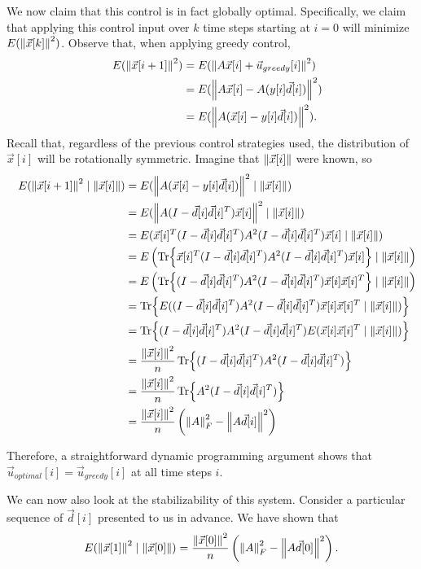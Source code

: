 \documentclass[letterpaper]{article}
\theoremstyle{remark}
\newcommand{\eqn}[1]{\begin{alignat*}{2}#1\end{alignat*}}
\begin{document}
We now claim that this control is in fact globally optimal. Specifically, we claim that applying this control input over $k$ time steps starting at $i=0$ will minimize $E(\norm{\vec{x}[k]}^2)$. Observe that, when applying greedy control,
\eqn{
    && E(\norm{\vec{x}[i+1]}^2) &= E(\norm{A\vec{x}[i] + \vec{u}_{greedy}[i]}^2) \\
    &&&= E(\norm{A\vec{x}[i] - A(y[i]\vec{d}[i])}^2) \\
    &&&= E(\norm{A(\vec{x}[i] - y[i]\vec{d}[i])}^2).
}
Recall that, regardless of the previous control strategies used, the distribution of $\vec{x}[i]$ will be rotationally symmetric. Imagine that $\norm{\vec{x}[i]}$ were known, so
\eqn{
    && E(\norm{\vec{x}[i+1]}^2 \mid \norm{\vec{x}[i]}) &= E(\norm{A(\vec{x}[i] - y[i]\vec{d}[i])}^2 \mid \norm{\vec{x}[i]}) \\
    &&&= E(\norm{A(I - \vec{d}[i]\vec{d}[i]^T)\vec{x}[i]}^2 \mid \norm{\vec{x}[i]}) \\
    &&&= E(\vec{x}[i]^T (I - \vec{d}[i]\vec{d}[i]^T) A^2 (I - \vec{d}[i]\vec{d}[i]^T) \vec{x}[i] \mid \norm{\vec{x}[i]}) \\
    &&&= E\left(\Tr{\vec{x}[i]^T (I - \vec{d}[i]\vec{d}[i]^T) A^2 (I - \vec{d}[i]\vec{d}[i]^T) \vec{x}[i]} \mid \norm{\vec{x}[i]}\right) \\
    &&&= E\left(\Tr{(I - \vec{d}[i]\vec{d}[i]^T) A^2 (I - \vec{d}[i]\vec{d}[i]^T) \vec{x}[i]\vec{x}[i]^T} \mid \norm{\vec{x}[i]}\right) \\
    &&&= \Tr{E((I - \vec{d}[i]\vec{d}[i]^T) A^2 (I - \vec{d}[i]\vec{d}[i]^T) \vec{x}[i]\vec{x}[i]^T \mid \norm{\vec{x}[i]})} \\
    &&&= \Tr{(I - \vec{d}[i]\vec{d}[i]^T) A^2 (I - \vec{d}[i]\vec{d}[i]^T)E(\vec{x}[i]\vec{x}[i]^T \mid \norm{\vec{x}[i]})} \\
    &&&= \frac{\norm{\vec{x}[i]}^2}{n} \Tr{(I - \vec{d}[i]\vec{d}[i]^T) A^2 (I - \vec{d}[i]\vec{d}[i]^T)} \\
    &&&= \frac{\norm{\vec{x}[i]}^2}{n} \Tr{A^2 (I - \vec{d}[i]\vec{d}[i]^T)} \\
    &&&= \frac{\norm{\vec{x}[i]}^2}{n}\left(\norm{A}^2_F - \norm{A\vec{d}[i]}^2\right)
}

Therefore, a straightforward dynamic programming argument shows that $\vec{u}_{optimal}[i] = \vec{u}_{greedy}[i]$ at all time steps $i$.

We can now also look at the stabilizability of this system. Consider a particular sequence of $\vec{d}[i]$ presented to us in advance. We have shown that
\eqn{
    && E(\norm{\vec{x}[1]}^2 \mid \norm{\vec{x}[0]}) &= \frac{\norm{\vec{x}[0]}^2}{n} \left(\norm{A}^2_F - \norm{A\vec{d}[0]}^2\right).
}
\end{document}
